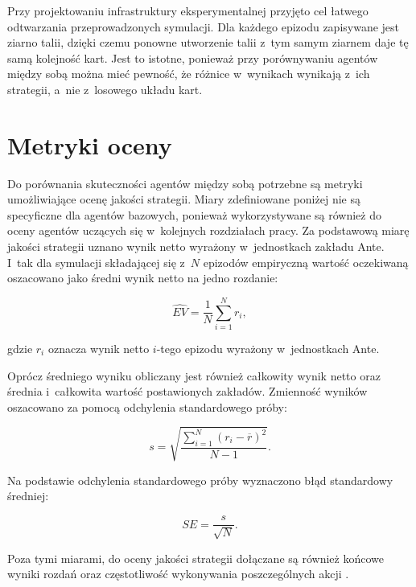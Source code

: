 Przy projektowaniu infrastruktury eksperymentalnej przyjęto cel
łatwego odtwarzania przeprowadzonych symulacji. Dla każdego epizodu
zapisywane jest ziarno talii, dzięki czemu ponowne utworzenie talii z~tym samym
ziarnem daje tę samą kolejność kart. Jest to istotne, ponieważ
przy porównywaniu agentów między sobą można mieć pewność, że różnice w~wynikach
wynikają z~ich strategii, a~nie z~losowego układu kart.

\section{Metryki oceny}
\label{sec:metryki-agentow-bazowych}

Do porównania skuteczności agentów między sobą potrzebne są metryki
umożliwiające ocenę jakości strategii. Miary zdefiniowane poniżej nie są
specyficzne dla agentów bazowych, ponieważ
wykorzystywane są również do oceny agentów uczących się w~kolejnych
rozdziałach pracy.
Za podstawową miarę jakości strategii uznano wynik netto wyrażony
w~jednostkach zakładu Ante. I~tak dla symulacji składającej się z~\(N\)
epizodów empiryczną wartość oczekiwaną oszacowano jako średni wynik
netto na jedno rozdanie:

\begin{equation}
    \widehat{EV}
    =
    \frac{1}{N}
    \sum_{i=1}^{N} r_i,
\end{equation}

gdzie \(r_i\) oznacza wynik netto \(i\)-tego epizodu wyrażony
w~jednostkach Ante.

Oprócz średniego wyniku obliczany jest również całkowity wynik netto oraz
średnia i~całkowita wartość postawionych zakładów. Zmienność wyników
oszacowano za pomocą odchylenia standardowego próby:

\begin{equation}
    s
    =
    \sqrt{
        \frac{
            \sum_{i=1}^{N}
            \left(r_i - \overline{r}\right)^2
        }{
            N - 1
        }
    }.
\end{equation}

Na podstawie odchylenia standardowego próby wyznaczono błąd standardowy średniej:

\begin{equation}
    SE
    =
    \frac{s}{\sqrt{N}}.
\end{equation}

Poza tymi miarami, do oceny jakości strategii dołączane są również
końcowe wyniki rozdań oraz częstotliwość
wykonywania poszczególnych akcji \cite{montgomery_runger_2018}.

